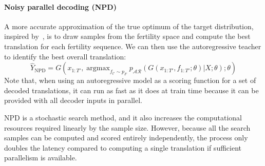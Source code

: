 \documentclass{article} %
\DeclareMathOperator*{\argmax}{argmax} %
\begin{document}
\vspace{-5pt}
\paragraph{Noisy parallel decoding (NPD)} A more accurate approximation of the true optimum of the target distribution, inspired by~\citet{cho2016noisy}, is to draw samples from the fertility space and compute the best translation for each fertility sequence.
We can then use the autoregressive teacher to identify the best overall translation:
\begin{equation}
\hat{Y}_\text{NPD} = G(x_{1:T'}, \argmax_{f_{t'} \sim p_F} p_{\mathcal{AR}}(G(x_{1:T'}, f_{1:T'};\theta)|X;\theta);\theta)
\end{equation}
Note that, when using an autoregressive model as a scoring function for a set of decoded translations, it can run as fast as it does at train time because it can be provided with all decoder inputs in parallel.

NPD is a stochastic search method, and it also increases the computational resources required linearly by the sample size. However, because all the search samples can be computed and scored entirely independently, the process only doubles the latency compared to computing a single translation if sufficient parallelism is available.
\end{document}
